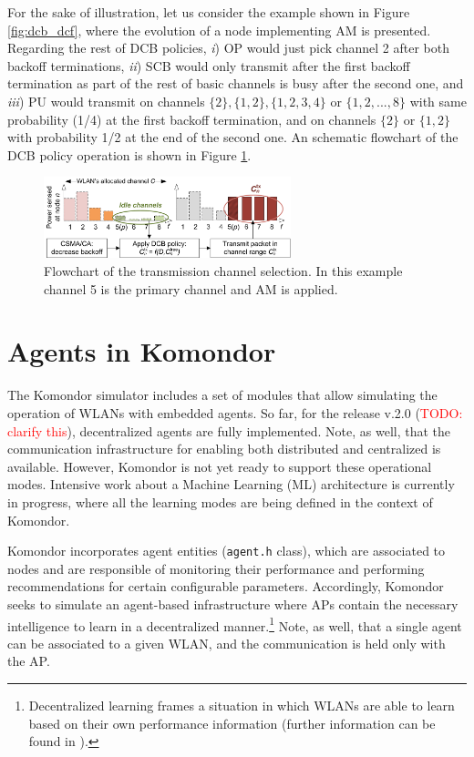 \documentclass[a4paper]{article}
\begin{document}
For the sake of illustration, let us consider the example shown in Figure \ref{fig:dcb_dcf}, where the evolution of a node implementing AM is presented. Regarding the rest of DCB policies, \textit{i}) OP would just pick channel 2 after both backoff terminations, \textit{ii}) SCB would only transmit after the first backoff termination as part of the rest of basic channels is busy after the second one, and \textit{iii}) PU would transmit on channels $\{2\}, \{1,2\}, \{1,2,3,4\}$ or $\{1,2,...,8\}$ with same probability (1/4) at the first backoff termination, and on channels $\{2\}$ or $\{1,2\}$ with probability 1/2 at the end of the second one. An schematic flowchart of the DCB policy operation is shown in Figure \ref{fig:cb_policy_flowchart}.

\begin{figure}[h]
	\centering
	\includegraphics[width=0.64\textwidth]{images/cb_policy_flowchart.png}
	\caption{Flowchart of the transmission channel selection. In this example channel 5 is the primary channel and AM is applied.}    
	\label{fig:cb_policy_flowchart}
\end{figure}

\section{Agents in Komondor}
\label{section:agents}
The Komondor simulator includes a set of modules that allow simulating the operation of WLANs with embedded agents. So far, for the release v.2.0 (\textcolor{red}{TODO: clarify this}), decentralized agents are fully implemented. Note, as well, that the communication infrastructure for enabling both distributed and centralized is available. However, Komondor is not yet ready to support these operational modes. Intensive work about a Machine Learning (ML) architecture is currently in progress, where all the learning modes are being defined in the context of Komondor. 

Komondor incorporates agent entities (\texttt{agent.h} class), which are associated to nodes and are responsible of monitoring their performance and performing recommendations for certain configurable parameters. Accordingly, Komondor seeks to simulate an agent-based infrastructure where APs contain the necessary intelligence to learn in a decentralized manner.\footnote{Decentralized learning frames a situation in which WLANs are able to learn based on their own performance information (further information can be found in \cite{wilhelmi2017implications, wilhelmi2017collaborative, wilhelmi2018potential}).} Note, as well, that a single agent can be associated to a given WLAN, and the communication is held only with the AP.
\end{document}
